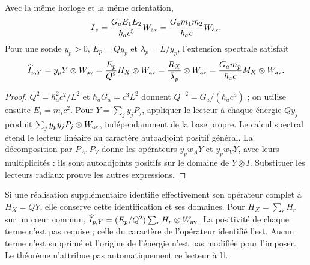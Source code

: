 \begin{theorem}
\label{hmtcuatro:gea:autoinercial-radial} Avec la même horloge et la même orientation,
\begin{equation}
\overline I_v=\frac{G_aE_1E_2}{\hbar_ac^5}W_{\rm av}
=\frac{G_am_1m_2}{\hbar_ac}W_{\rm av}.
\label{hmtcuatro:gea:mach-gravedad}
\end{equation}
Pour une sonde $y_p>0$, $E_p=Qy_p$ et $\bar\lambda_p=L/y_p$, l’extension spectrale satisfait
\begin{equation}
\widehat I_{p,Y}=y_pY\otimes W_{\rm av}
=\frac{E_p}{Q^2}H_X\otimes W_{\rm av}
=\frac{R_X}{\bar\lambda_p}\otimes W_{\rm av}
=\frac{G_am_p}{\hbar_ac}M_X\otimes W_{\rm av}.
\label{hmtcuatro:gea:identidad-autoinercial}
\end{equation}
\end{theorem}
\begin{proof}
$Q^2=\hbar_a^2c^2/L^2$ et $\hbar_aG_a=c^3L^2$ donnent $Q^{-2}=G_a/(\hbar_ac^5)$ ; on utilise ensuite $E_i=m_ic^2$. Pour $Y=\sum_jy_jP_j$, appliquer le lecteur à chaque énergie $Qy_j$ produit $\sum_jy_py_jP_j\otimes W_{\rm av}$, indépendamment de la base propre. Le calcul spectral étend le lecteur linéaire au caractère autoadjoint positif général. La décomposition par $P_A,P_V$ donne les opérateurs $y_pw_AY$ et $y_pw_VY$, avec leurs multiplicités : ils sont autoadjoints positifs sur le domaine de $Y\otimes I$. Substituer les lecteurs radiaux prouve les autres expressions.
\end{proof}

Si une réalisation supplémentaire identifie effectivement son opérateur complet à $H_X=QY$, elle conserve cette identification et ses domaines. Pour $H_X=\sum_rH_r$ sur un cœur commun, $\widehat I_{p,Y}=(E_p/Q^2)\sum_rH_r\otimes W_{\rm av}$. La positivité de chaque terme n’est pas requise ; celle du caractère de l’opérateur identifié l’est. Aucun terme n’est supprimé et l’origine de l’énergie n’est pas modifiée pour l’imposer. Le théorème n’attribue pas automatiquement ce lecteur à $\mathbb H$.

